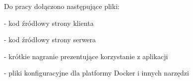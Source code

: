 \documentclass[a4paper,twoside,12pt]{book}
\begin{document}
\begin{appendices}
Do pracy dołączono następujące pliki:

- kod źródłowy strony klienta

- kod źródłowy strony serwera

- krótkie nagranie prezentujące korzystanie z aplikacji

- pliki konfiguracyjne dla platformy Docker i innych narzędzi

\listoffigures
{}
\listoftables
{}

\end{appendices}
\end{document}

